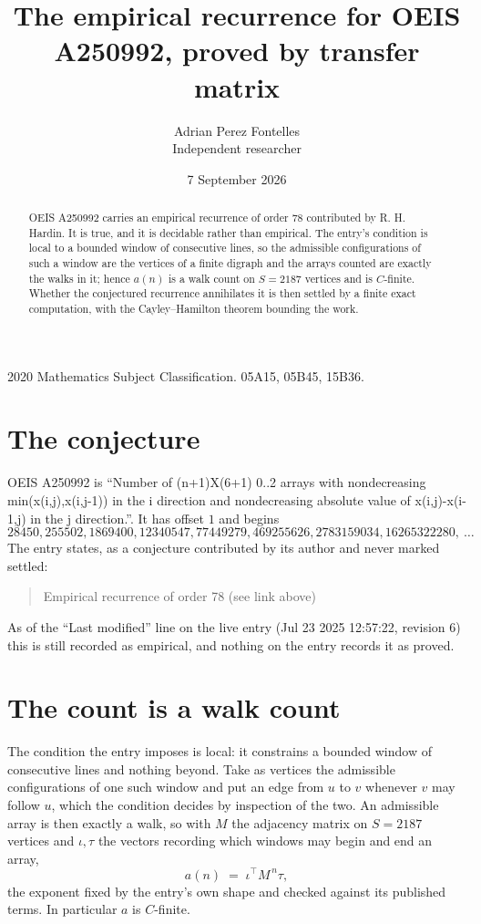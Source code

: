 \documentclass[11pt,a4paper]{article}
\title{The empirical recurrence for OEIS A250992, proved by transfer matrix}
\author{Adrian Perez Fontelles\\ \small Independent researcher}
\date{7 September 2026}
\theoremstyle{plain}
\theoremstyle{definition}
\begin{document}
\maketitle

\begin{abstract}
OEIS A250992 carries an empirical recurrence of order $78$ contributed by R. H. Hardin. It is
true, and it is decidable rather than empirical. The entry's condition is local to a bounded window of consecutive lines, so
the admissible configurations of such a window are the vertices of a finite digraph and the
arrays counted are exactly the walks in it; hence $a(n)$ is a walk count on $S=2187$ vertices
and is $C$-finite. Whether the conjectured recurrence annihilates it is then settled by a
finite exact computation, with the Cayley--Hamilton theorem bounding the work.
\end{abstract}

\noindent\small 2020 Mathematics Subject Classification. 05A15, 05B45, 15B36.\normalsize

\section{The conjecture}

OEIS A250992 is ``Number of (n+1)X(6+1) 0..2 arrays with nondecreasing min(x(i,j),x(i,j-1)) in the i direction and nondecreasing absolute value of x(i,j)-x(i-1,j) in the j direction.''. It has offset $1$ and begins
\[
28450, 255502, 1869400, 12340547, 77449279, 469255626, 2783159034, 16265322280,\ \dots
\]
The entry states, as a conjecture contributed by its author and never marked settled:
\begin{quote}
Empirical recurrence of order 78 (see link above)
\end{quote}
As of the ``Last modified'' line on the live entry (Jul 23 2025 12:57:22, revision 6) this is still
recorded as empirical, and nothing on the entry records it as proved.

\section{The count is a walk count}

The condition the entry imposes is local: it constrains a bounded window of consecutive lines and nothing beyond. Take as
vertices the admissible configurations of one such window and put an edge from $u$ to $v$
whenever $v$ may follow $u$, which the condition decides by inspection of the two. An
admissible array is then exactly a walk, so with $M$ the adjacency matrix on $S=2187$ vertices
and $\iota,\tau$ the vectors recording which windows may begin and end an array,
\[
a(n)\;=\;\iota^{\!\top}M^{\,n}\tau ,
\]
the exponent fixed by the entry's own shape and checked against its published terms. In
particular $a$ is $C$-finite.
\end{document}
